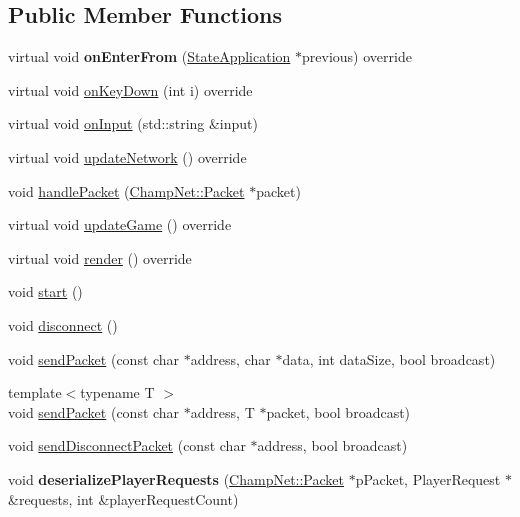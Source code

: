 \subsection*{Public Member Functions}
\begin{DoxyCompactItemize}
\item 
\hypertarget{class_state_server_ae1517f9d264d1fb39c16512477caa83e}{virtual void {\bfseries on\-Enter\-From} (\hyperlink{class_state_application}{State\-Application} $\ast$previous) override}\label{class_state_server_ae1517f9d264d1fb39c16512477caa83e}

\item 
virtual void \hyperlink{class_state_server_a69b988594b45275a55bcb7ba5ceb7aeb}{on\-Key\-Down} (int i) override
\item 
virtual void \hyperlink{class_state_server_a680525d2a1036dbbefaf21a7057fb39e}{on\-Input} (std\-::string \&input)
\item 
virtual void \hyperlink{class_state_server_aceb9a260a5c4a4d46607e8fe71be2667}{update\-Network} () override
\item 
void \hyperlink{class_state_server_a8983232b9935b74fda71ed409b45c7fd}{handle\-Packet} (\hyperlink{class_champ_net_1_1_packet}{Champ\-Net\-::\-Packet} $\ast$packet)
\item 
virtual void \hyperlink{class_state_server_afc726acef321e4fd0b9f3aeacb126845}{update\-Game} () override
\item 
virtual void \hyperlink{class_state_server_afb476eb4f969490b00944a93157b76c8}{render} () override
\item 
void \hyperlink{class_state_server_aaeb4f49e47304f186f87f79a3612b085}{start} ()
\item 
void \hyperlink{class_state_server_a066a1d342ca796d2f40d273dc375a032}{disconnect} ()
\item 
void \hyperlink{class_state_server_ab03b5fe855178bbfa7ec2741b7a08172}{send\-Packet} (const char $\ast$address, char $\ast$data, int data\-Size, bool broadcast)
\item 
{\footnotesize template$<$typename T $>$ }\\void \hyperlink{class_state_server_a88bda7a0bfd4878781f4676e3b4b19bd}{send\-Packet} (const char $\ast$address, T $\ast$packet, bool broadcast)
\item 
void \hyperlink{class_state_server_a4ba2a2bde5a70c0aa50ad936ca88ad44}{send\-Disconnect\-Packet} (const char $\ast$address, bool broadcast)
\item 
\hypertarget{class_state_server_a1d5bf4d1f14be55beab88feb0a8b5336}{void {\bfseries deserialize\-Player\-Requests} (\hyperlink{class_champ_net_1_1_packet}{Champ\-Net\-::\-Packet} $\ast$p\-Packet, Player\-Request $\ast$\&requests, int \&player\-Request\-Count)}\label{class_state_server_a1d5bf4d1f14be55beab88feb0a8b5336}


\end{DoxyCompactItemize}
